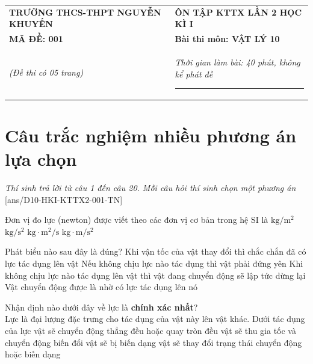 \begin{center}
	\begin{tabular}{M{9.25cm}M{8.75cm}}
		\textbf{TRƯỜNG THCS-THPT NGUYỄN KHUYẾN}& \textbf{ÔN TẬP KTTX LẦN 2 HỌC KÌ I}\\
		\textbf{MÃ ĐỀ: 001}& \textbf{Bài thi môn: VẬT LÝ 10}\\
		\textit{(Đề thi có 05 trang)}& \textit{Thời gian làm bài: 40 phút, không kể phát đề}
		
		\noindent\rule{4cm}{0.8pt} \\
	\end{tabular}
\end{center}
\setcounter{section}{0}
\section{Câu trắc nghiệm nhiều phương án lựa chọn}
\textit{Thí sinh trả lời từ câu 1 đến câu 20. Mỗi câu hỏi thí sinh chọn một phương án}
\setcounter{ex}{0}
[ans/D10-HKI-KTTX2-001-TN]
\begin{ex}
	Đơn vị đo lực (newton) được viết theo các đơn vị cơ bản trong hệ SI là
	\choice
	{$\si{\kilogram/\meter^2}$}
	{$\si{\kilogram/\second^2}$}
	{$\si{\kilogram\cdot\meter^2/\second}$}
	{\True $\si{\kilogram\cdot\meter/\second^2}$}
	\loigiai{}
\end{ex}
\begin{ex}
	Phát biểu nào sau đây là đúng?
	\choice
	{\True Khi vận tốc của vật thay đổi thì chắc chắn đã có lực tác dụng lên vật}
	{Nếu không chịu lực nào tác dụng thì vật phải đứng yên}
	{Khi không chịu lực nào tác dụng lên vật thì vật đang chuyển động sẽ lập tức dừng lại}
	{Vật chuyển động được là nhờ có lực tác dụng lên nó}
	\loigiai{}
\end{ex}
\begin{ex}
	Nhận định nào dưới đây về lực là \textbf{chính xác nhất}?\\
	Lực là đại lượng đặc trưng cho tác dụng của vật này lên vật khác. Dưới tác dụng của lực
	\choice
	{vật sẽ chuyển động thẳng đều hoặc quay tròn đều}
	{vật sẽ thu gia tốc và chuyển động biến đổi}
	{vật sẽ bị biến dạng}
	{\True vật sẽ thay đổi trạng thái chuyển động hoặc biến dạng}
	\loigiai{}
\end{ex}

